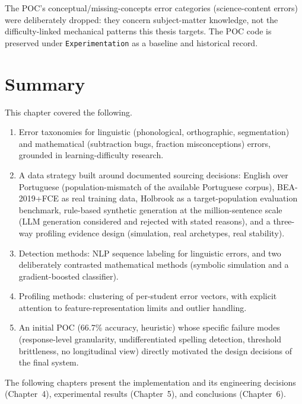 The POC's conceptual/missing-concepts error categories (science-content errors) were deliberately dropped: they concern subject-matter knowledge, not the difficulty-linked mechanical patterns this thesis targets. The POC code is preserved under \texttt{Experimentation} as a baseline and historical record.

\section{Summary}
\label{sec:method_summary}

This chapter covered the following.
\begin{enumerate}
    \item Error taxonomies for linguistic (phonological, orthographic, segmentation) and mathematical (subtraction bugs, fraction misconceptions) errors, grounded in learning-difficulty research.
    \item A data strategy built around documented sourcing decisions: English over Portuguese (population-mismatch of the available Portuguese corpus), BEA-2019+FCE as real training data, Holbrook as a target-population evaluation benchmark, rule-based synthetic generation at the million-sentence scale (LLM generation considered and rejected with stated reasons), and a three-way profiling evidence design (simulation, real archetypes, real stability).
    \item Detection methods: NLP sequence labeling for linguistic errors, and two deliberately contrasted mathematical methods (symbolic simulation and a gradient-boosted classifier).
    \item Profiling methods: clustering of per-student error vectors, with explicit attention to feature-representation limits and outlier handling.
    \item An initial POC (66.7\% accuracy, heuristic) whose specific failure modes (response-level granularity, undifferentiated spelling detection, threshold brittleness, no longitudinal view) directly motivated the design decisions of the final system.
\end{enumerate}

The following chapters present the implementation and its engineering decisions (Chapter~4), experimental results (Chapter~5), and conclusions (Chapter~6).
